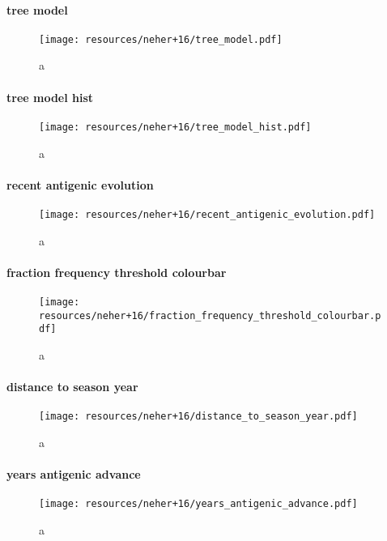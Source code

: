 \documentclass{beamer}
\begin{document}
\begin{darkframes}
    \begin{frame}{\subsecname}
      \framesubtitle{tree model}
      \begin{figure}
        \texttt{[image: resources/neher+16/tree\_model.pdf]}
        \caption{\footnotesize a}
      \end{figure}
    \end{frame}

    \begin{frame}{\subsecname}
      \framesubtitle{tree model hist}
      \begin{figure}
        \texttt{[image: resources/neher+16/tree\_model\_hist.pdf]}
        \caption{\footnotesize a}
      \end{figure}
    \end{frame}

    \begin{frame}{\subsecname}
      \framesubtitle{recent antigenic evolution}
      \begin{figure}
        \texttt{[image: resources/neher+16/recent\_antigenic\_evolution.pdf]}
        \caption{\footnotesize a}
      \end{figure}
    \end{frame}

    \begin{frame}{\subsecname}
      \framesubtitle{fraction frequency threshold colourbar}
      \begin{figure}
        \texttt{[image: resources/neher+16/fraction\_frequency\_threshold\_colourbar.pdf]}
        \caption{\footnotesize a}
      \end{figure}
    \end{frame}

    \begin{frame}{\subsecname}
      \framesubtitle{distance to season year}
      \begin{figure}
        \texttt{[image: resources/neher+16/distance\_to\_season\_year.pdf]}
        \caption{\footnotesize a}
      \end{figure}
    \end{frame}


    \begin{frame}{\subsecname}
      \framesubtitle{years antigenic advance}
      \begin{figure}
        \texttt{[image: resources/neher+16/years\_antigenic\_advance.pdf]}
        \caption{\footnotesize a}
      \end{figure}
    \end{frame}












\end{darkframes}
\end{document}
